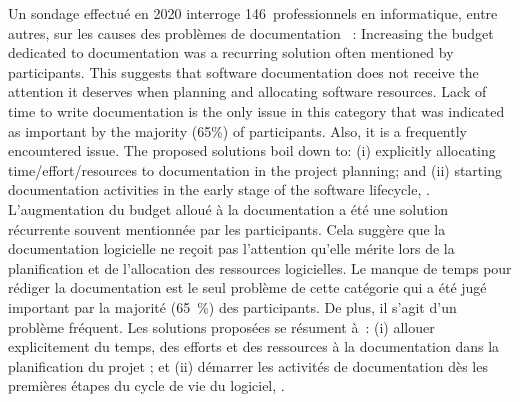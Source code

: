 {Un sondage effectué en 2020 interroge 146~professionnels en informatique, entre autres, sur les causes des problèmes de documentation \cite{aghajani_doc_2020}~:
\quoteenfr
{Increasing the budget dedicated to documentation was a recurring solution often mentioned by participants. This suggests that software documentation does not receive the attention it deserves when planning and allocating software resources.
\elide
Lack of time to write documentation is the only issue in this category that was indicated as important by the majority (65\%) of participants. Also, it is a frequently encountered issue. The proposed solutions boil down to: (i) explicitly allocating time/effort/resources to documentation in the project planning; and (ii) starting documentation activities in the early stage of the software lifecycle, \elide.}
{L'augmentation du budget alloué à la documentation a été une solution récurrente souvent mentionnée par les participants. Cela suggère que la documentation logicielle ne reçoit pas l'attention qu'elle mérite lors de la planification et de l'allocation des ressources logicielles.
\elide Le manque de temps pour rédiger la documentation est le seul problème de cette catégorie qui a été jugé important par la majorité (65~\%) des participants. De plus, il s'agit d'un problème fréquent. Les solutions proposées se résument à~: (i) allouer explicitement du temps, des efforts et des ressources à la documentation dans la planification du projet ; et (ii) démarrer les activités de documentation dès les premières étapes du cycle de vie du logiciel, \elide.}
{\cite{aghajani_doc_2020}}
\vspace{-1\baselineskip}
}{}


